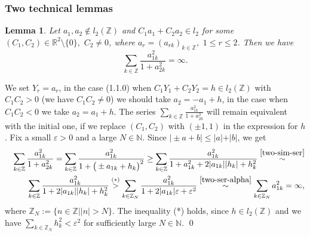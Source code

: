 \documentclass[preprint,12pt]{elsarticle}
\newtheorem{lem}[thm]{Lemma}
\numberwithin{equation}{section}
\begin{document}
\subsubsection{Two technical lemmas}
%
\begin{lem}
\label{l.(011)-fin}
Let $a_1,a_2\not\in l_2(\mathbb Z)$ and  $C_1a_1+C_2a_2\in l_2$ for some $(C_1,C_2)\in \mathbb R^2\setminus\{0\},\,\,C_2\not=0$, where $a_r=(a_{rk})_{k\in \mathbb Z},\,\,1\leq r\leq 2$.
Then we have 
\begin{equation}
\label{(011)-fin} 
\sum_{k\in \mathbb Z}\frac{a^2_{1k}}{
1+a_{2k}^2}=\infty.
\end{equation}
\end{lem}
%
\begin{pf}
We set $Y_r=a_r$, in the case (1.1.0) when $C_1Y_1+C_2Y_2=h\in l_2(\mathbb Z)$ with $C_1C_2>0$ 
(we have $C_1C_2\!\not=\!0$) 
we should take $a_2=-a_1+h$, in the case when  $C_1C_2<0$ we  take $a_2=a_1+h$.  The series  $\sum_{k\in \mathbb Z}\frac{a^2_{1k}}{
1+a_{2k}^2}$ will remain equivalent  with the initial one, if we replace
$(C_1,C_2)$ with $(\pm 1,1)$ in the expression for $h$. 
Fix a small $\varepsilon\!>\!0$ and a large $N
\!\in \!\mathbb N$.
Since $ \vert\pm a+b\vert\leq \vert a\vert +\vert b\vert$,
we get
\begin{eqnarray*}
&& 
\sum_{k\in \mathbb Z}\frac{a^2_{1k}}{
1+a_{2k}^2}=\sum_{k\in \mathbb Z}\frac{a^2_{1k}}{
1+\big(\pm a_{1k}+h_k\big)^2}\geq 
\sum_{k\in \mathbb Z}\frac{a^2_{1k}}{
1+a^2_{1k}+2\vert a_{1k}\vert \vert h_k\vert +h^2_k}\stackrel{\eqref{two-sim-ser}}{\sim}\\
&&\sum_{k\in \mathbb Z}\frac{a^2_{1k}}{
1+2\vert a_{1k}\vert \vert h_k\vert +h^2_k}\stackrel{(*)}{>}
\sum_{k\in \mathbb Z_N}\frac{a^2_{1k}}{
1+2\vert a_{1k}\vert \varepsilon +\varepsilon^2}\stackrel{\eqref{two-ser-alpha} }{\sim} \sum_{k\in \mathbb Z_N}a^2_{1k}=\infty,
\end{eqnarray*}
%
where $\mathbb Z_N:=\{n\in \mathbb Z\mid \vert n\vert>N\}$. The inequality (*) holds,
since $h\in l_2(\mathbb Z)$ and  we have $\sum_{k\in \mathbb Z_N}h^2_k<\varepsilon^2$ for sufficiently large $N\in \mathbb N$.
\qed\end{pf}
\end{document}
